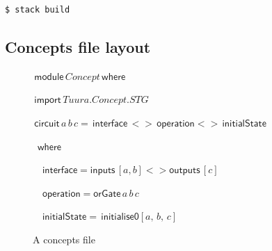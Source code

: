 \documentclass[british,conference,compsoc]{IEEEtran}
\begin{document}
\begin{lstlisting}[language=bash]
  $ stack build
\end{lstlisting}

\subsection{Concepts file layout}

\begin{figure}[H]
\begin{centering}

\begin{flushleft}
$\,\mathsf{module}\, Concept \, \mathsf{where}$
\par\end{flushleft}

\begin{flushleft}
$\,\mathsf{import}\, Tuura.Concept.STG$
\par\end{flushleft}

\begin{flushleft}
$\,\mathsf{circuit}\,a \,b \,c=\mathsf{\,interface}\,<> \mathsf{\, operation}
<>\,\mathsf{initialState}$

$\,\,\,\mathsf{where}$
\par\end{flushleft}

\begin{flushleft}
$\,\,\,\,\,\,\mathsf{interface}=\mathsf{inputs}\,[a,b]<>\mathsf{outputs}\,[c]$
\par\end{flushleft}

\begin{flushleft}
$\,\,\,\,\,\,\mathsf{operation}= \mathsf{orGate}\,a\,b\,c$
\par\end{flushleft}

\begin{flushleft}
$\,\,\,\,\,\,\mathsf{initialState}= \, \mathsf{initialise0}[a,\,b,\,c]$
\par\end{flushleft}

\par\end{centering}

\begin{centering}
\protect\caption{\label{fig:concepts_file}A concepts file}

\par\end{centering}

\end{figure}
\end{document}
